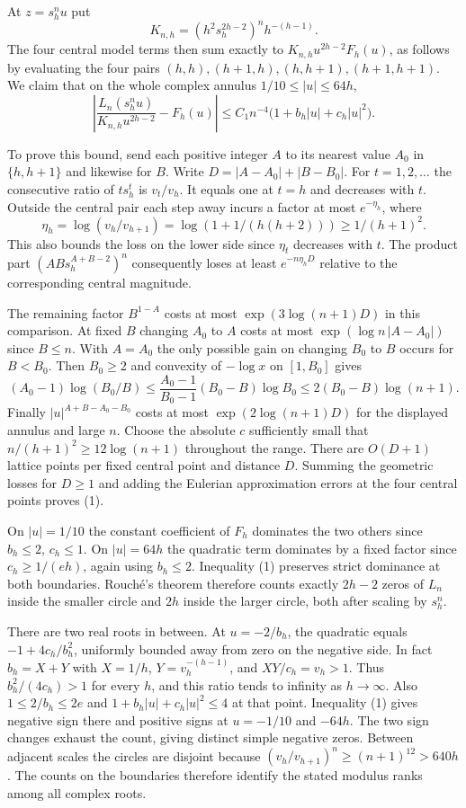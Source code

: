 \documentclass[11pt]{article}
\begin{document}
At $z=s_h^n u$ put
\[
 K_{n,h}=(h^2 s_h^{2h-2})^n h^{-(h-1)} .
\]
The four central model terms then sum exactly to $K_{n,h}u^{2h-2}F_h(u)$, as follows by evaluating the four pairs $(h,h),(h+1,h),(h,h+1),(h+1,h+1)$. We claim that on the whole complex annulus $1/10\le |u|\le64h$,
\[
 \left|\frac{L_n(s_h^n u)}{K_{n,h}u^{2h-2}}-F_h(u)\right|
 \le C_1 n^{-4}\big(1+b_h|u|+c_h|u|^2\big). \tag{1}
\]

To prove this bound, send each positive integer $A$ to its nearest value $A_0$ in $\{h,h+1\}$ and likewise for $B$. Write $D=|A-A_0|+|B-B_0|$. For $t=1,2,\dots$ the consecutive ratio of $t s_h^t$ is $v_t/v_h$. It equals one at $t=h$ and decreases with $t$. Outside the central pair each step away incurs a factor at most $e^{-\eta_h}$, where
\[
 \eta_h=\log(v_h/v_{h+1})=\log(1+1/(h(h+2)))\ge 1/(h+1)^2 .
\]
This also bounds the loss on the lower side since $\eta_t$ decreases with $t$. The product part $(A B s_h^{A+B-2})^n$ consequently loses at least $e^{-n\eta_h D}$ relative to the corresponding central magnitude.

The remaining factor $B^{1-A}$ costs at most $\exp(3\log(n+1)D)$ in this comparison. At fixed $B$ changing $A_0$ to $A$ costs at most $\exp(\log n\,|A-A_0|)$ since $B\le n$. With $A=A_0$ the only possible gain on changing $B_0$ to $B$ occurs for $B<B_0$. Then $B_0\ge2$ and convexity of $-\log x$ on $[1,B_0]$ gives
\[
 (A_0-1)\log(B_0/B)\le\frac{A_0-1}{B_0-1}(B_0-B)\log B_0
 \le2(B_0-B)\log(n+1).
\]
Finally $|u|^{A+B-A_0-B_0}$ costs at most $\exp(2\log(n+1)D)$ for the displayed annulus and large $n$. Choose the absolute $c$ sufficiently small that $n/(h+1)^2\ge12\log(n+1)$ throughout the range. There are $O(D+1)$ lattice points per fixed central point and distance $D$. Summing the geometric losses for $D\ge1$ and adding the Eulerian approximation errors at the four central points proves (1).

On $|u|=1/10$ the constant coefficient of $F_h$ dominates the two others since $b_h\le2$, $c_h\le1$. On $|u|=64h$ the quadratic term dominates by a fixed factor since $c_h\ge 1/(eh)$, again using $b_h\le2$. Inequality (1) preserves strict dominance at both boundaries. Rouché's theorem therefore counts exactly $2h-2$ zeros of $L_n$ inside the smaller circle and $2h$ inside the larger circle, both after scaling by $s_h^n$.

There are two real roots in between. At $u=-2/b_h$, the quadratic equals $-1+4c_h/b_h^2$, uniformly bounded away from zero on the negative side. In fact $b_h=X+Y$ with $X=1/h$, $Y=v_h^{-(h-1)}$, and $XY/c_h=v_h>1$. Thus $b_h^2/(4c_h)>1$ for every $h$, and this ratio tends to infinity as $h\to\infty$. Also $1\le2/b_h\le2e$ and $1+b_h|u|+c_h|u|^2\le4$ at that point. Inequality (1) gives negative sign there and positive signs at $u=-1/10$ and $-64h$. The two sign changes exhaust the count, giving distinct simple negative zeros. Between adjacent scales the circles are disjoint because $(v_h/v_{h+1})^n\ge(n+1)^{12}>640h$. The counts on the boundaries therefore identify the stated modulus ranks among all complex roots.
\end{document}
